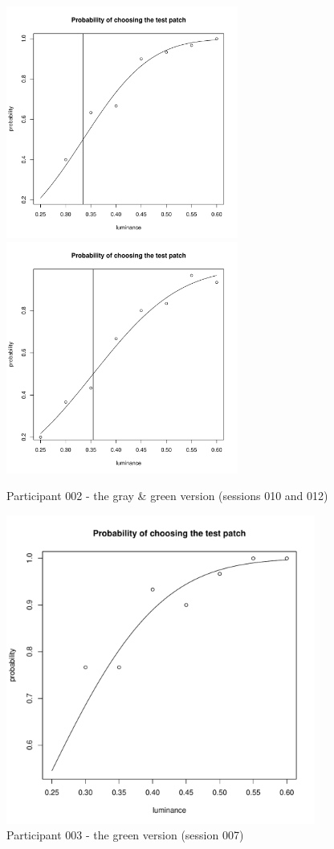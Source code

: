 \documentclass[a4paper,12pt]{article} %
\begin{document}
\begin{figure}[!htb]
    \centering
    \caption{Participant 002 - the gray \& green version (sessions 010 and 012)}
    \label{figure_002}
    \includegraphics[width=3in]{2-10-plot.pdf}
    \includegraphics[width=3in]{2-12-plot.pdf}
\end{figure}

\begin{figure}[!htb]
    \centering
    \caption{Participant 003 - the green version (session 007)}
    \label{figure_003}
    \includegraphics[width=4in]{3-7-plot.pdf}
\end{figure}
\end{document}
